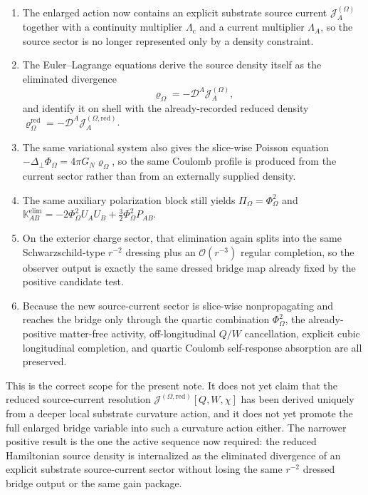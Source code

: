\documentclass[11pt]{article}
\newcommand{\ProjSub}{P}
\newcommand{\SpatialD}{\mathcal D}
\newcommand{\LapPerp}{\Delta_\perp}
\newcommand{\FlowPot}{\Phi_\Omega}
\newcommand{\BalanceField}{\Pi_\Omega}
\newcommand{\SourceDensity}{\varrho_\Omega}
\newcommand{\SourceDensityRed}{\varrho_\Omega^{\mathrm{red}}}
\newcommand{\SourceCurrent}{\mathcal J^{(\Omega)}}
\newcommand{\SourceCurrentRed}{\mathcal J^{(\Omega,\mathrm{red})}}
\newcommand{\ContMult}{\Lambda_{\mathrm c}}
\newcommand{\CurrentMult}{\Lambda}
\newcommand{\AuxPol}{\mathbb K}
\begin{document}
\begin{enumerate}
    \item The enlarged action now contains an explicit substrate source current \(\SourceCurrent_A\) together with a continuity multiplier \(\ContMult\) and a current multiplier \(\CurrentMult_A\), so the source sector is no longer represented only by a density constraint.
    \item The Euler--Lagrange equations derive the source density itself as the eliminated divergence
    \[
    \SourceDensity=-\SpatialD^A\SourceCurrent_A,
    \]
    and identify it on shell with the already-recorded reduced density \(\SourceDensityRed=-\SpatialD^A\SourceCurrentRed_A\).
    \item The same variational system also gives the slice-wise Poisson equation \(-\LapPerp\FlowPot=4\pi G_N\SourceDensity\), so the same Coulomb profile is produced from the current sector rather than from an externally supplied density.
    \item The same auxiliary polarization block still yields \(\BalanceField=\FlowPot^2\) and \(\AuxPol_{AB}^{\mathrm{elim}}=-2\FlowPot^2U_AU_B+\tfrac32\FlowPot^2\ProjSub_{AB}\).
    \item On the exterior charge sector, that elimination again splits into the same Schwarzschild-type \(r^{-2}\) dressing plus an \(\mathcal O(r^{-3})\) regular completion, so the observer output is exactly the same dressed bridge map already fixed by the positive candidate test.
    \item Because the new source-current sector is slice-wise nonpropagating and reaches the bridge only through the quartic combination \(\FlowPot^2\), the already-positive matter-free activity, off-longitudinal \(Q/W\) cancellation, explicit cubic longitudinal completion, and quartic Coulomb self-response absorption are all preserved.
\end{enumerate}

This is the correct scope for the present note. It does not yet claim that the reduced source-current resolution \(\SourceCurrentRed[Q,W,\chi]\) has been derived uniquely from a deeper local substrate curvature action, and it does not yet promote the full enlarged bridge variable into such a curvature action either. The narrower positive result is the one the active sequence now required: the reduced Hamiltonian source density is internalized as the eliminated divergence of an explicit substrate source-current sector without losing the same \(r^{-2}\) dressed bridge output or the same gain package.
\end{document}
